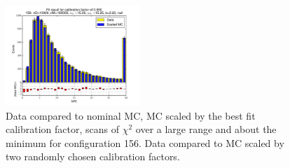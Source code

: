 \begin{figure}[htbp]
\begin{center}
\includegraphics[width=0.45\textwidth]{../FIGURES/156/FIG_Fit_result_for_calibration_factor_of_0_950.pdf} 
\caption{Data compared to nominal MC, MC scaled by the best fit calibration factor, scans of $\chi^2$ over a large range and about the minimum for configuration 156. Data compared to MC scaled by two randomly chosen calibration factors.} 
\label{tab:best_156} 
\end{center} \end{figure} 

